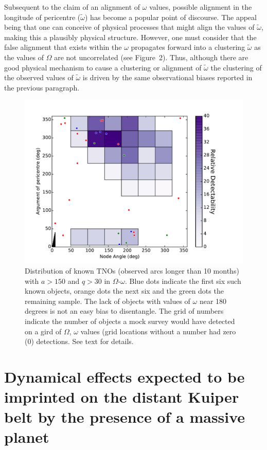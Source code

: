 \documentclass{aastex62}
\begin{document}
Subsequent to the claim of an alignment of $\omega$ values, possible
alignment in the longitude of pericentre ($\tilde{\omega}$) has become
a popular point of discourse.  The appeal being that one can conceive
of physical processes that might align the values of $\tilde{\omega}$,
making this a plausibly physical structure.  However, one must
consider that the false alignment that exists within the $\omega$
propagates forward into a clustering $\tilde{\omega}$ as the values of
$\Omega$ are not uncorrelated (see Figure~2).  Thus, although there
are good physical mechanism to cause a clustering or alignment of
$\tilde{\omega}$ the clustering of the observed values of
$\tilde{\omega}$ is driven by the same observational biases reported
in the previous paragraph.

\begin{figure}
\centering
\includegraphics[width=\textwidth]{figure2.pdf}
\caption{Distribution of known TNOs (observed arcs longer than 10 months) with $a > 150$ and $q > 30$ in $\Omega$-$\omega$.  Blue dots indicate the first six such known objects, orange dots the next six and the green dots the remaining sample.  The lack of objects with values of $\omega$ near 180 degrees is not an easy bias to disentangle.  The grid of numbers indicate the number of objects a mock survey would have detected on a gird of $\Omega$, $\omega$ values (grid locations without a number had zero (0) detections.  See text for details.}
\label{fig:bias}
\end{figure}

\section{Dynamical effects expected to be imprinted on the distant Kuiper belt by the presence of a massive planet}
\end{document}
